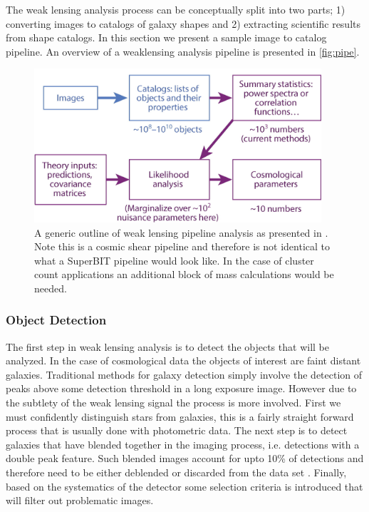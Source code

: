 The weak lensing analysis process can be conceptually split into two parts; 1) converting images to catalogs of galaxy shapes and 2) extracting scientific results from shape catalogs. In this section we present a sample image to catalog pipeline. An overview of a weaklensing analysis pipeline is presented in \autoref{fig:pipe}.

\begin{figure}
    \begin{small}
        \begin{center}
            \includegraphics[width=0.95\textwidth]{WeakLensing/figs/pipe.jpg}
        \end{center}
        \caption{A generic outline of weak lensing pipeline analysis as presented in \cite{rachel_2018}. Note this is a cosmic shear pipeline and therefore is not identical to what a SuperBIT pipeline would look like. In the case of cluster count applications an additional block of mass calculations would be needed.}
        \label{fig:pipe}
    \end{small}
\end{figure}


\subsubsection{Object Detection}

The first step in weak lensing analysis is to detect the objects that will be analyzed. In the case of cosmological data the objects of interest are faint distant galaxies. Traditional methods for galaxy detection simply involve the detection of peaks above some detection threshold in a long exposure image. However due to the subtlety of the weak lensing signal the process is more involved. First we must confidently distinguish stars from galaxies, this is a fairly straight forward process that is usually done with photometric data. The next step is to detect galaxies that have blended together in the imaging process, i.e. detections with a double peak feature. Such blended images account for upto 10\% of detections and therefore need to be either deblended or discarded from the data set \cite{rachel_2018,general_2013}. Finally, based on the systematics of the detector some selection criteria is introduced that will filter out problematic images. 

